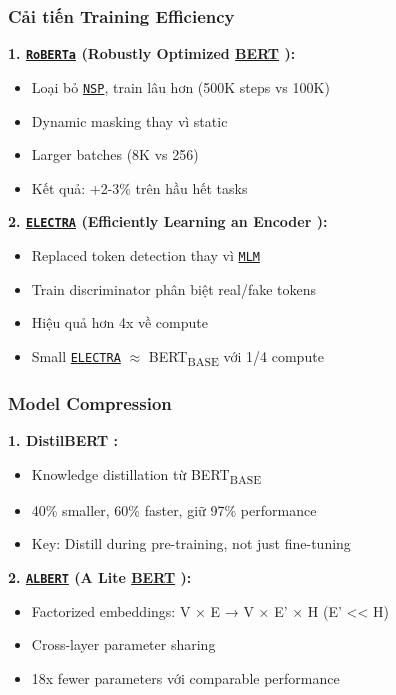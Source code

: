 \subsubsection{Cải tiến Training Efficiency}

\textbf{1. \hyperref[acro:roberta]{\texttt{RoBERTa}} (Robustly Optimized \hyperref[acro:bert]{\textbf{BERT}} \cite{liu2019roberta}):}
\begin{itemize}
    \item Loại bỏ \hyperref[acro:nsp]{\texttt{NSP}}, train lâu hơn (500K steps vs 100K)
    \item Dynamic masking thay vì static
    \item Larger batches (8K vs 256)
    \item Kết quả: +2-3\% trên hầu hết tasks
\end{itemize}

\textbf{2.
\hyperref[acro:electra]{\texttt{ELECTRA}} (Efficiently Learning an Encoder \cite{clark2020electra}):}
\begin{itemize}
    \item Replaced token detection thay vì \hyperref[acro:mlm]{\texttt{MLM}}
    \item Train discriminator phân biệt real/fake tokens
    \item Hiệu quả hơn 4x về compute
    \item Small \hyperref[acro:electra]{\texttt{ELECTRA}} $\approx$ BERT\textsubscript{BASE} với 1/4 compute
\end{itemize}

\subsubsection{Model Compression}

\textbf{1.
DistilBERT \cite{sanh2019distilbert}:}
\begin{itemize}
    \item Knowledge distillation từ BERT\textsubscript{BASE}
    \item 40\% smaller, 60\% faster, giữ 97\% performance
    \item Key: Distill during pre-training, not just fine-tuning
\end{itemize}

\textbf{2.
\hyperref[acro:albert]{\texttt{ALBERT}} (A Lite \hyperref[acro:bert]{\textbf{BERT}} \cite{lan2019albert}):}
\begin{itemize}
    \item Factorized embeddings: V × E → V × E' × H (E' << H)
    \item Cross-layer parameter sharing
    \item 18x fewer parameters với comparable performance
\end{itemize}

